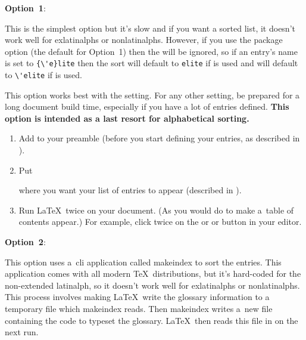 \documentclass[report,inlinetitle,widecs]{nlctdoc}
\makeatletter
\newcommand*{\optionlabel}[1]{%
 \@glstarget{option#1}{}\textbf{Option~#1}}
\makeatother
\begin{document}
\begin{description}
\item[]\optionlabel1: 

 This is the simplest option but it's slow and if
 you want a sorted list, it doesn't work well for \glspl{exlatinalph} or 
 \glspl{nonlatinalph}. However, if you use the
  package option (the default for
 Option~1) then the  will be
 ignored, so if an entry's name is set to \verb|{\'e}lite| then the
 sort will default to \texttt{elite} if 
  is used
 and will default to \verb|\'elite| if 
 is used.

 This option works best with the  setting. For any
 other setting, be prepared for a long document build time,
 especially if you have a lot of entries defined. \textbf{This
option is intended as a last resort for alphabetical sorting.}

  \begin{enumerate}
    \item Add  to your preamble (before you
    start defining your entries, as described in
    ).

    \item Put
\begin{definition}
\end{definition}
    where you want your list of entries to appear (described in
    ).

    \item Run \LaTeX\ twice on your document. (As you would do to
    make a~table of contents appear.) For example, click twice on
    the  or  or  button in your editor.
  \end{enumerate}

\item\optionlabel2:

   This option uses a~\gls{cli} application called \gls{makeindex} to sort 
   the entries. This application comes with all modern \TeX\ distributions, 
   but it's hard-coded for the non-extended \gls{latinalph}, so 
   it doesn't work well for \glspl{exlatinalph} or
   \glspl{nonlatinalph}. This process involves making \LaTeX\ write the 
   glossary information to a temporary file which \gls{makeindex} reads. 
   Then \gls{makeindex} writes a~new file containing the code to typeset 
   the glossary. \LaTeX\ then reads this file in on the next run.


\end{description}
\end{document}
